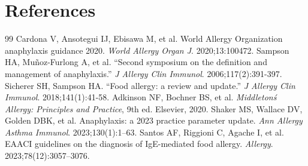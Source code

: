 \section*{References}
\begin{thebibliography}{99}
 Cardona V, Ansotegui IJ, Ebisawa M, et al. World Allergy Organization anaphylaxis guidance 2020. \textit{World Allergy Organ J}. 2020;13:100472.
 Sampson HA, Muñoz-Furlong A, et al. ``Second symposium on the definition and management of anaphylaxis.'' \textit{J Allergy Clin Immunol}. 2006;117(2):391-397.
 Sicherer SH, Sampson HA. ``Food allergy: a review and update.'' \textit{J Allergy Clin Immunol}. 2018;141(1):41-58.
 Adkinson NF, Bochner BS, et al. \textit{Middleton\'s Allergy: Principles and Practice}, 9th ed. Elsevier, 2020.
 Shaker MS, Wallace DV, Golden DBK, et al. Anaphylaxis: a 2023 practice parameter update. \textit{Ann Allergy Asthma Immunol}. 2023;130(1):1--63.
 Santos AF, Riggioni C, Agache I, et al. EAACI guidelines on the diagnosis of IgE-mediated food allergy. \textit{Allergy}. 2023;78(12):3057--3076.
\end{thebibliography}
